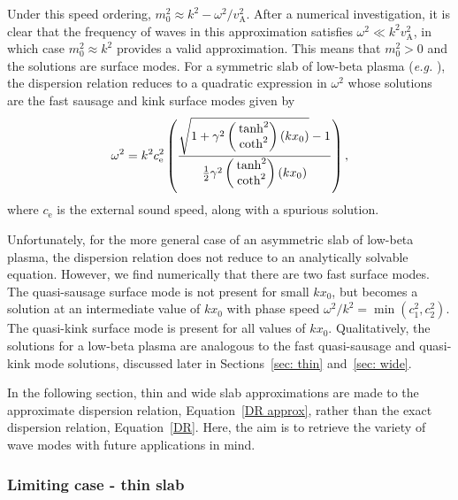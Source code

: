 \documentclass[12pt,draft]{../style-files/ociamthesis}
\begin{document}
Under this speed ordering, $m_0^2\approx{}k^2-\omega^2/v_\textrm{A}^2$. After a numerical investigation, it is clear that the frequency of waves in this approximation satisfies $\omega^2\ll{}k^2v_\textrm{A}^2$, in which case $m_0^2\approx k^2$ provides a valid approximation. This means that $m_0^2>0$ and the solutions are surface modes. For a symmetric slab of low-beta plasma (\textit{e.g.} \citealt{rob81b}), the dispersion relation reduces to a quadratic expression in $\omega^2$ whose solutions are the fast sausage and kink surface modes given by
\begin{equation}
\omega^2=k^2c_\textrm{e}^2\left(\frac{\sqrt{1+\gamma^2\left(\hspace{-0.11in}\begin{matrix}&\tanh^2 \\&\coth^2 \end{matrix}\right)(kx_0)}-1}{\frac{1}{2}\gamma^2\left(\hspace{-0.11in}\begin{matrix}&\tanh^2 \\&\coth^2 \end{matrix}\right)(kx_0)}\right),
\end{equation}
where $c_\textrm{e}$ is the external sound speed, along with a spurious solution.

Unfortunately, for the more general case of an asymmetric slab of low-beta plasma, the dispersion relation does not reduce to an analytically solvable equation. However, we find numerically that there are two fast surface modes. The quasi-sausage surface mode is not present for small $kx_0$, but becomes a solution at an intermediate value of $kx_0$ with phase speed $\omega^2/k^2=\min{(c_1^2,c_2^2)}$. The quasi-kink surface mode is present for all values of $kx_0$. Qualitatively, the solutions for a low-beta plasma are analogous to the fast quasi-sausage and quasi-kink mode solutions, discussed later in Sections~\ref{sec: thin} and~\ref{sec: wide}.

In the following section, thin and wide slab approximations are made to the approximate dispersion relation, Equation~\eqref{DR approx}, rather than the exact dispersion relation, Equation~\eqref{DR}. Here, the aim is to retrieve the variety of wave modes with future applications in mind.


\subsubsection{Limiting case - thin slab} \label{sec: thin slab}
\end{document}
